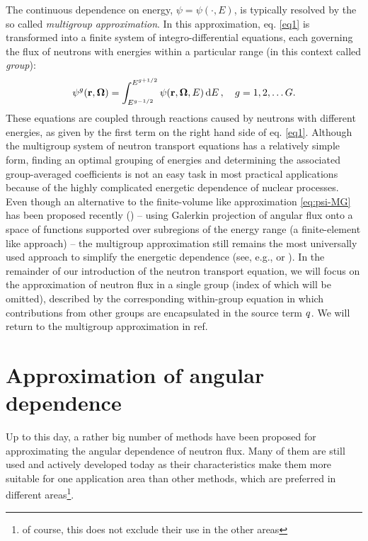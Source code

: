 The continuous dependence on energy, $\psi = \psi(\cdot, E)$, is typically resolved by the so called \textit{multigroup
approximation}. In this approximation, eq. \eqref{eq1} is transformed into a finite system of integro-differential
equations, each governing the flux of neutrons with energies within a particular range (in this context called
\textit{group}):
\begin{equation}\label{eq:psi-MG}
  \psi^g(\mathbf{r}, \mathbf{\Omega}) = \int_{E^{g-1/2}}^{E^{g+1/2}}\psi(\mathbf{r}, \mathbf{\Omega}, E)\,\text{d}E\,,\quad g = 1, 2,\ldots G.
\end{equation} 
These equations are coupled through reactions caused by neutrons with different energies, as given by the
first term on the right hand side of eq. \eqref{eq1}. Although the multigroup system of neutron transport equations has a
relatively simple form, finding an optimal grouping of energies and determining the associated group-averaged
coefficients is not an easy task in most practical applications because of the highly complicated energetic dependence
of nuclear processes. Even though an alternative to the finite-volume like approximation \eqref{eq:psi-MG} has been
proposed recently (\cite{Douglass}) -- using Galerkin projection of angular flux onto a space of 
functions supported over subregions of the energy range (a finite-element like approach) --  the multigroup
approximation still remains the most universally used approach to simplify the energetic dependence (see, e.g.,
\cite[Chap.~5]{Cacuci1} or \cite{Cho1}). In the remainder of our introduction of the neutron transport equation, we
will focus on the approximation of neutron flux in a single group (index of which will be omitted), described by the 
corresponding within-group equation in which contributions from other groups are encapsulated in the source term $q$.
We will return to the multigroup approximation in \alert{ref}.

\section{Approximation of angular dependence}

Up to this day, a rather big number of methods have been proposed for approximating the angular dependence of neutron
flux. Many of them are still used and actively developed today as their characteristics make them more suitable for one
application area than other methods, which are preferred in different areas\footnote{of course, this does not exclude
their use in the other areas}.

